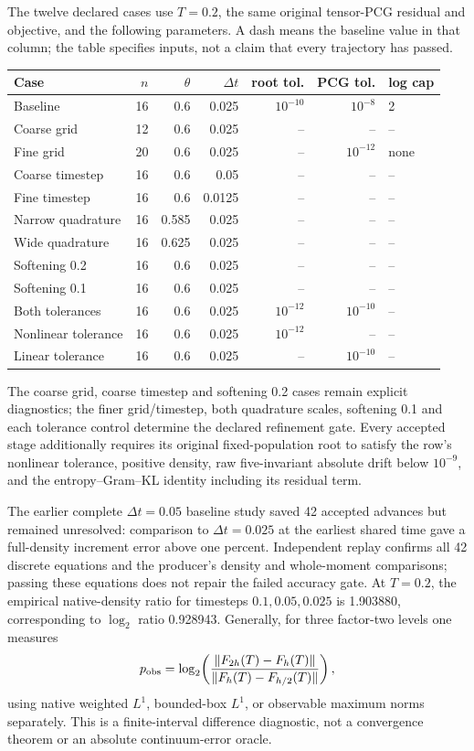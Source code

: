 \documentclass[11pt,letterpaper]{article}
\begin{document}
The twelve declared cases use $T=0.2$, the same original tensor-PCG
residual and objective, and the following parameters. A dash means the
baseline value in that column; the table specifies inputs, not a claim
that every trajectory has passed.
\begin{center}
\begin{tabular}{lrrrrrl}
\hline
Case & $n$ & $\theta$ & $\Delta t$ & root tol. & PCG tol. & log cap\\
\hline
Baseline &16&0.6&0.025&$10^{-10}$&$10^{-8}$&2\\
Coarse grid &12&0.6&0.025&--&--&--\\
Fine grid &20&0.6&0.025&--&$10^{-12}$&none\\
Coarse timestep &16&0.6&0.05&--&--&--\\
Fine timestep &16&0.6&0.0125&--&--&--\\
Narrow quadrature &16&0.585&0.025&--&--&--\\
Wide quadrature &16&0.625&0.025&--&--&--\\
Softening 0.2 &16&0.6&0.025&--&--&--\\
Softening 0.1 &16&0.6&0.025&--&--&--\\
Both tolerances &16&0.6&0.025&$10^{-12}$&$10^{-10}$&--\\
Nonlinear tolerance &16&0.6&0.025&$10^{-12}$&--&--\\
Linear tolerance &16&0.6&0.025&--&$10^{-10}$&--\\
\hline
\end{tabular}
\end{center}
The coarse grid, coarse timestep and softening 0.2 cases remain explicit
diagnostics; the finer grid/timestep, both quadrature scales, softening
0.1 and each tolerance control determine the declared refinement gate.
Every accepted stage additionally requires its original fixed-population
root to satisfy the row's nonlinear tolerance, positive density, raw
five-invariant absolute drift below $10^{-9}$, and the entropy--Gram--KL
identity including its residual term.

The earlier complete $\Delta t=0.05$ baseline study saved 42 accepted
advances but remained unresolved: comparison to $\Delta t=0.025$ at the
earliest shared time gave a full-density increment error above one
percent. Independent replay confirms all 42 discrete equations and the
producer's density and whole-moment comparisons; passing these equations
does not repair the failed accuracy gate. At $T=0.2$, the empirical
native-density ratio for timesteps $0.1,0.05,0.025$ is 1.903880,
corresponding to $\log_2$ ratio 0.928943. Generally, for three factor-two
levels one measures
\[
 p_{\rm obs}=\log_2\!\left(
 \frac{\|F_{2h}(T)-F_h(T)\|}{\|F_h(T)-F_{h/2}(T)\|}\right),
\]
using native weighted $L^1$, bounded-box $L^1$, or observable maximum
norms separately. This is a finite-interval difference diagnostic,
not a convergence theorem or an absolute continuum-error oracle.
\end{document}
